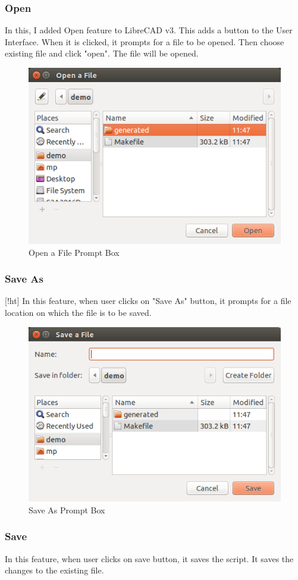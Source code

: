 \subsubsection{Open}
In this, I added Open feature to LibreCAD v3. This adds a button to the User Interface. When it is clicked, it prompts for a file to be opened. Then choose existing file and click "open". The file will be opened.\\
\begin{figure}[!ht]
\centering
\includegraphics[scale=0.4]{images/open.png}
\vspace{-1em}
\caption{Open a File Prompt Box}
\hspace{-1.5em}
\end{figure}
\subsubsection{Save As}[!ht]
In this feature, when user clicks on "Save As" button, it prompts for a file location on which the file is to be saved.
\begin{figure}[!ht]
\centering
\includegraphics[scale=0.4]{images/save.png}
\vspace{-1em}
\caption{Save As Prompt Box}
\hspace{-1.5em}
\end{figure}
\subsubsection{Save}
In this feature, when user clicks on save button, it saves the script. It saves the changes to the existing file. 
 